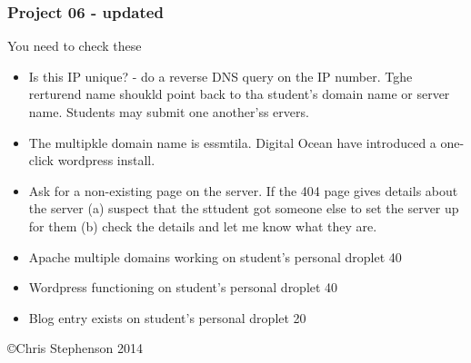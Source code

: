 \documentclass[12pt, a4paper]{article}
\begin{document}
\subsubsection*{Project 06 - updated}

You need to check these

\begin{itemize}
 \item Is this IP unique? - do a reverse DNS query on the IP number. Tghe rerturend name shoukld point back to tha student's domain name or server name. Students may submit one another'ss ervers.
 \item The multipkle domain name is essmtila. Digital Ocean have introduced a one-click wordpress install.
 \item Ask for a non-existing page on the server. If the 404 page gives details about the server (a) suspect that the sttudent got someone else to set the server up for them (b) check the details and let me know what they are.
\end{itemize}
 



\begin{itemize}
 \item Apache multiple domains working on student's personal droplet 40
 \item Wordpress functioning on student's personal droplet 40
 \item Blog entry exists on student's personal droplet 20
\end{itemize}
 


\copyright Chris Stephenson 2014
\end{document}
